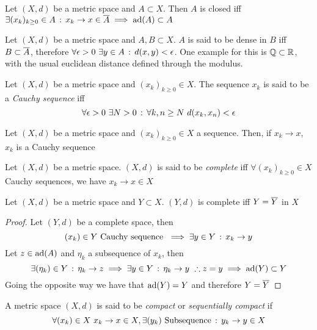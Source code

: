 \documentclass[../complete.tex]{subfiles}
\begin{document}
\begin{prop}
	Let $(X,d)$ be a metric space and $A\subset X$. Then $A$ is closed iff $\exists(x_k)_{k\ge0}\in A\, :\,  x_k\to x\in\overline{A}\implies\operatorname{ad}(A)\subset A$
\end{prop}
\begin{dfn}
	Let $(X,d)$ be a metric space and $A,B\subset X$. $A$ is said to be dense in $B$ iff $B\subset\overline{A}$, therefore $\forall\epsilon>0\ \exists y\in A\, :\,  d(x,y)<\epsilon$. One example for this is $\mathbb{Q}\subset\mathbb{R}$, with the usual euclidean distance defined through the modulus.
\end{dfn}
\begin{dfn}
	Let $(X,d)$ be a metric space and $(x_k)_{k\ge0}\in X$. The sequence $x_k$ is said to be a \textit{Cauchy sequence} iff
	\begin{equation*}
		\forall\epsilon>0\ \exists N>0\, :\, \forall k,n\ge N\ d(x_k,x_n)<\epsilon
	\end{equation*}
\end{dfn}
\begin{prop}
	Let $(X,d)$ be a metric space and $(x_k)_{k\ge0}\in X$ a sequence. Then, if $x_k\to x$, $x_k$ is a Cauchy sequence
\end{prop}
\begin{dfn}
	Let $(X,d)$ be a metric space. $(X,d)$ is said to be \textit{complete} iff $\forall(x_k)_{k\ge0}\in X$ Cauchy sequences, we have $x_k\to x\in X$
\end{dfn}
\begin{thm}[Completeness]
	Let $(X,d)$ be a metric space and $Y\subset X$. $(Y,d)$ is complete iff $Y=\overline{Y}$ in $X$
\end{thm}
\begin{proof}
	Let $(Y,d)$ be a complete space, then
	\begin{equation*}
		(x_k)\in Y\text{ Cauchy sequence }\implies\exists y\in Y\, :\,  x_k\to y
	\end{equation*}
	Let $z\in\operatorname{ad}(A)$ and $\eta_k$ a subsequence of $x_k$, then
	\begin{equation*}
		\exists(\eta_k)\in Y\, :\, \eta_k\to z\implies\exists y\in Y\, :\, \eta_k\to y\ \therefore z=y\implies \operatorname{ad}(Y)\subset Y
	\end{equation*}
	Going the opposite way we have that $\operatorname{ad}(Y)=Y$ and therefore $Y=\overline{Y}$
\end{proof}
\begin{dfn}
	A metric space $(X,d)$ is said to be \textit{compact} or \textit{sequentially compact} if
	\begin{equation*}
		\forall(x_k)\in X\ x_k\to x\in X, \exists(y_k)\text{ Subsequence}\, :\,  y_k\to y\in X
	\end{equation*}
\end{dfn}
\end{document}
